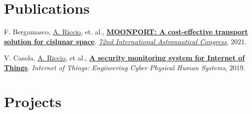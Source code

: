 \documentclass[letterpaper]{twentysecondcv} %
\begin{document}
\section{Publications}
 F. Bergamasco, \href{https://scholar.google.com/citations?user=A3XqqTEAAAAJ&hl=it}{A. Riccio}, et. al.,
 \href{https://www.researchgate.net/publication/355856343_MOONPORT_A_cost-effective_transport_solution_for_cislunar_space}
 {\textbf{MOONPORT: A cost-effective transport solution for cislunar space}}.
 \href{https://iafastro.directory/iac/paper/id/63931/summary/}
 {\textit{72nd International Astronautical Congress}}, 2021.

 V. Casola,  \href{https://scholar.google.com/citations?user=A3XqqTEAAAAJ&hl=it}{A. Riccio}, et al.,
 \href{https://www.researchgate.net/publication/334175322_A_security_monitoring_system_for_Internet_of_Things}
 {\textbf{A security monitoring system for Internet of Things}}.
 \textit{Internet of Things: Engineering Cyber Physical Human Systems}, 2019.

%
%
\section{Projects}
\end{document}
